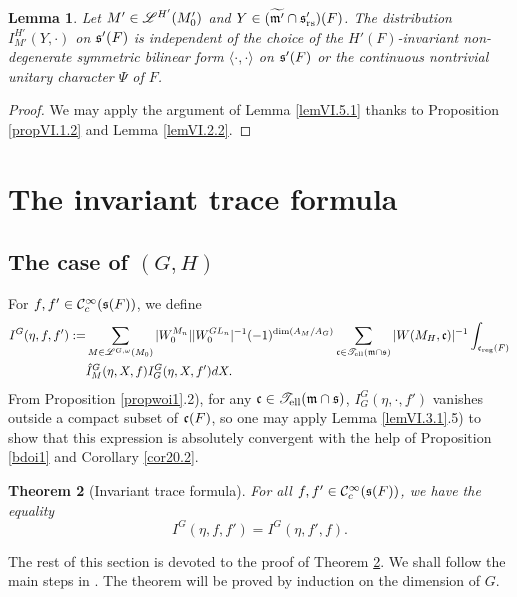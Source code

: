 \documentclass[a4paper]{amsart}
\newcommand{\fm}{{\mathfrak{m}}} \newcommand{\fn}{{\mathfrak{n}}}\newcommand{\fo}{{\mathfrak{o}}} \newcommand{\fp}{{\mathfrak{p}}}
\newcommand{\wt}{\widetilde}                        \newcommand{\wh}{\widehat}                      \newcommand{\wpair}[1]{\left\{{#1}\right\}}
\newtheorem{thm}{Theorem}[section]
\newtheorem{lem}[thm]{Lemma}
\theoremstyle{definition}
\theoremstyle{remark}
\numberwithin{equation}{subsection}
\begin{document}
\begin{lem}\label{lemVI.5.2}
Let $M'\in\mathscr{L}^{H'}(M'_0)$ and $Y\in(\wt{\fm'}\cap\fs'_\rs)(F)$. The distribution $I_{M'}^{H'}(Y, \cdot)$ on ${\mathfrak{s}}'(F)$ is independent of the choice of the $H'(F)$-invariant non-degenerate symmetric bilinear form $\langle\cdot, \cdot\rangle$ on ${\mathfrak{s}}'(F)$ or the continuous nontrivial unitary character $\Psi$ of $F$. 
\end{lem}

\begin{proof}
We may apply the argument of Lemma \ref{lemVI.5.1} thanks to Proposition \ref{propVI.1.2} and Lemma \ref{lemVI.2.2}. 
\end{proof}




\section{\textbf{The invariant trace formula}}\label{secinvtf}

\subsection{The case of $(G,H)$}

For $f, f'\in{\mathcal {C}}_c^\infty({\mathfrak{s}}(F))$, we define
\begin{equation}\label{geominvltf1}
\begin{split}
 I^G(\eta, f, f'):=&\sum_{M\in\msl^{G, \omega}(M_0)} |W_0^{M_n}| |W_0^{GL_n}|^{-1} (-1)^{\dim(A_M/A_G)} \sum_{\fc\in\mst_\el(\fm\cap\fs)} |W(M_H, \fc)|^{-1} \int_{\fc_\reg(F)} \\
 &\hat{I}_M^G(\eta, X, f) I_G^G(\eta, X, f') dX. 
\end{split}
\end{equation}
From Proposition \ref{propwoi1}.2), for any $\fc\in\mst_\el(\fm\cap\fs)$, $I_G^G(\eta, \cdot, f')$ vanishes outside a compact subset of ${\mathfrak{c}}(F)$, so one may apply Lemma \ref{lemVI.3.1}.5) to show that this expression is absolutely convergent with the help of Proposition \ref{bdoi1} and Corollary \ref{cor20.2}. 

\begin{thm}[Invariant trace formula]\label{invltf1}
For all $f, f'\in{\mathcal {C}}_c^\infty({\mathfrak{s}}(F))$, we have the equality
$$ I^G(\eta, f, f')=I^G(\eta, f', f). $$
\end{thm}

The rest of this section is devoted to the proof of Theorem \ref{invltf1}. We shall follow the main steps in \cite[\S VII.2-3]{MR1344131}. The theorem will be proved by induction on the dimension of $G$. 
\end{document}

